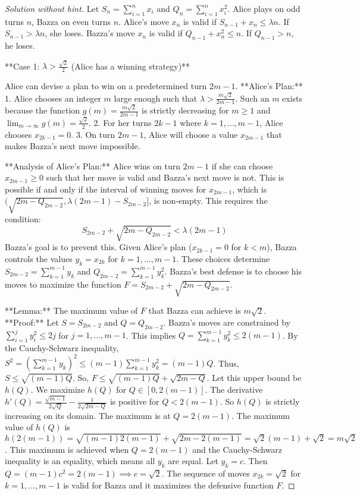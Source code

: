 \begin{proof} [Solution without hint]
Let $S_n = \sum_{i=1}^n x_i$ and $Q_n = \sum_{i=1}^n x_i^2$.
Alice plays on odd turns $n$, Bazza on even turns $n$.
Alice's move $x_n$ is valid if $S_{n-1}+x_n \le \lambda n$. If $S_{n-1} > \lambda n$, she loses.
Bazza's move $x_n$ is valid if $Q_{n-1}+x_n^2 \le n$. If $Q_{n-1} > n$, he loses.

**Case 1: $\lambda > \frac{\sqrt{2}}{2}$ (Alice has a winning strategy)**

Alice can devise a plan to win on a predetermined turn $2m-1$.
**Alice's Plan:**
1.  Alice chooses an integer $m$ large enough such that $\lambda > \frac{m\sqrt{2}}{2m-1}$. Such an $m$ exists because the function $g(m) = \frac{m\sqrt{2}}{2m-1}$ is strictly decreasing for $m \ge 1$ and $\lim_{m\to\infty} g(m) = \frac{\sqrt{2}}{2}$.
2.  For her turns $2k-1$ where $k=1, \dots, m-1$, Alice chooses $x_{2k-1}=0$.
3.  On turn $2m-1$, Alice will choose a value $x_{2m-1}$ that makes Bazza's next move impossible.

**Analysis of Alice's Plan:**
Alice wins on turn $2m-1$ if she can choose $x_{2m-1} \ge 0$ such that her move is valid and Bazza's next move is not. This is possible if and only if the interval of winning moves for $x_{2m-1}$, which is $(\sqrt{2m - Q_{2m-2}}, \lambda(2m-1) - S_{2m-2}]$, is non-empty. This requires the condition:
$$S_{2m-2} + \sqrt{2m - Q_{2m-2}} < \lambda(2m-1)$$
Bazza's goal is to prevent this. Given Alice's plan ($x_{2k-1}=0$ for $k<m$), Bazza controls the values $y_k = x_{2k}$ for $k=1, \dots, m-1$. These choices determine $S_{2m-2} = \sum_{k=1}^{m-1} y_k$ and $Q_{2m-2} = \sum_{k=1}^{m-1} y_k^2$. Bazza's best defense is to choose his moves to maximize the function $F = S_{2m-2} + \sqrt{2m - Q_{2m-2}}$.

**Lemma:** The maximum value of $F$ that Bazza can achieve is $m\sqrt{2}$.
**Proof:** Let $S = S_{2m-2}$ and $Q = Q_{2m-2}$. Bazza's moves are constrained by $\sum_{i=1}^j y_i^2 \le 2j$ for $j=1, \dots, m-1$. This implies $Q = \sum_{k=1}^{m-1} y_k^2 \le 2(m-1)$.
By the Cauchy-Schwarz inequality, $S^2 = (\sum_{k=1}^{m-1} y_k)^2 \le (m-1) \sum_{k=1}^{m-1} y_k^2 = (m-1)Q$. Thus, $S \le \sqrt{(m-1)Q}$.
So, $F \le \sqrt{(m-1)Q} + \sqrt{2m-Q}$. Let this upper bound be $h(Q)$. We maximize $h(Q)$ for $Q \in [0, 2(m-1)]$.
The derivative $h'(Q) = \frac{\sqrt{m-1}}{2\sqrt{Q}} - \frac{1}{2\sqrt{2m-Q}}$ is positive for $Q < 2(m-1)$. So $h(Q)$ is strictly increasing on its domain. The maximum is at $Q=2(m-1)$.
The maximum value of $h(Q)$ is $h(2(m-1)) = \sqrt{(m-1)2(m-1)} + \sqrt{2m-2(m-1)} = \sqrt{2}(m-1) + \sqrt{2} = m\sqrt{2}$.
This maximum is achieved when $Q=2(m-1)$ and the Cauchy-Schwarz inequality is an equality, which means all $y_k$ are equal. Let $y_k=c$. Then $Q=(m-1)c^2=2(m-1) \implies c=\sqrt{2}$. The sequence of moves $x_{2k}=\sqrt{2}$ for $k=1, \dots, m-1$ is valid for Bazza and it maximizes the defensive function $F$.


\end{proof}
